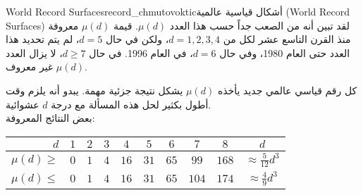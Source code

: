 \begin{surferIntroPage}{World Record Surfaces}{record_chmutovoktic}{أشكال قياسية عالمية (World Record Surfaces)}
لقد تبين أنه من الصعب جداً حسب هذا العدد $\mu(d)$.
قيمة $\mu(d)$ معروفة منذ القرن التاسع عشر لكل من $d=1,2,3,4$، ولكن في حال $d=5$، لم يتم تحديد هذا العدد حتى العام 1980، وفي حال $d=6$، في العام 1996.
   في حال $d\ge 7$، لا يزال العدد $\mu(d)$ غير معروف.
    
  
    كل رقم قياسي عالمي جديد يأخذه $\mu(d)$  يشكل نتيجة جزئية مهمة. يبدو أنه يلزم وقت أطول بكثير لحل هذه المسألة مع درجة $d$ عشوائية.\\ بعض النتائج المعروفة:
    
   \begin{center}
      \begin{tabular}{r|cccccccc|c}
        $d$ & $1$ & $2$ & $3$ & $4$ & $5$ & $6$ & $7$ & $8$ & $d$\\
        \hline
        \hline
        \rule{0pt}{1.2em}$\mu(d)\ge$ & $0$ & $1$ & $4$ & $16$ & $31$ & $65$ &
        $99$ & $168$ & 
        $\approx \frac{5}{12}d^3$\\[0.3em]
        \hline
        \rule{0pt}{1.2em}$\mu(d)\le$ & $0$ & $1$ & $4$ & $16$ & $31$ & $65$ &
        $104$ & $174$ & $\approx \frac{4}{9}d^3$
      \end{tabular}
    \end{center}
\end{surferIntroPage}
